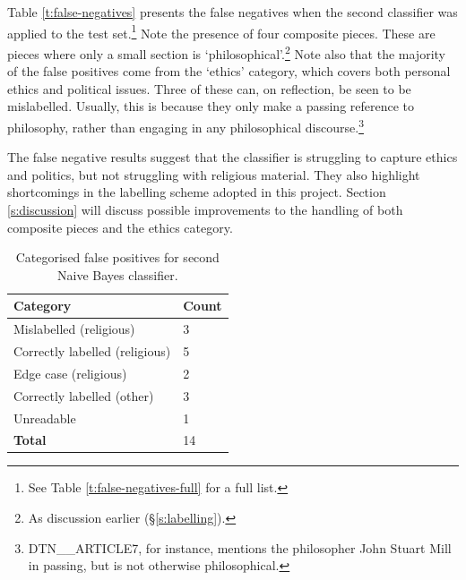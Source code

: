 \documentclass{article}
\begin{document}
Table \ref{t:false-negatives} presents the false negatives when the second classifier was applied to the test set.\footnote{See Table \ref{t:false-negatives-full} for a full list.} Note the presence of four composite pieces. These are pieces where only a small section is `philosophical'.\footnote{As discussion earlier (\S \ref{s:labelling}).} Note also that the majority of the false positives come from the `ethics' category, which covers both personal ethics and political issues. Three of these can, on reflection, be seen to be mislabelled. Usually, this is because they only make a passing reference to philosophy, rather than engaging in any philosophical discourse.\footnote{DTN\_\_\-ARTICLE7, for instance, mentions the philosopher John Stuart Mill in passing, but is not otherwise philosophical.} %

The false negative results suggest that the classifier is struggling to capture ethics and politics, but not struggling with religious material. They also highlight shortcomings in the labelling scheme adopted in this project. Section \ref{s:discussion} will discuss possible improvements to the handling of both composite pieces and the ethics category.

\begin{table}[]
        \centering
        \footnotesize
        \begin{tabular}{l|l}
          Category & Count \\
          \hline
          Mislabelled (religious) & 3 \\
          Correctly labelled (religious) & 5\\
          Edge case (religious) & 2 \\
          Correctly labelled (other) & 3 \\
          Unreadable & 1 \\
          \textbf{Total} & 14
        \end{tabular}
        \caption{Categorised false positives for second Naive Bayes classifier.}
        \label{t:false-positives}
\end{table}
\end{document}
